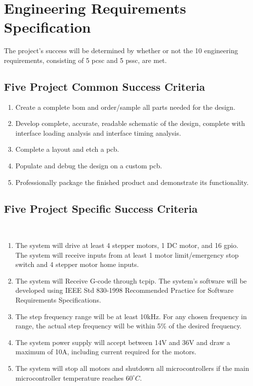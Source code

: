 \chapter{Engineering Requirements Specification}
The project's success will be determined by whether or not the 10 engineering requirements, consisting of 5 \gls{pcsc} and 5 \gls{pssc}, are met. 

\section{Five Project Common Success Criteria}
\begin{enumerate}
	\item Create a complete \gls{bom} and order/sample all parts needed for the design.
	\item Develop complete, accurate, readable schematic of the design, complete with interface loading analysis and interface timing analysis. 
	\item Complete a layout and etch a \gls{pcb}.
	\item Populate and debug the design on a custom \gls{pcb}.
	\item Professionally package the finished product and demonstrate its functionality.
\end{enumerate}

\section{Five Project Specific Success Criteria}\
\begin{enumerate}
	\item The system will drive at least 4 stepper motors, 1 DC motor, and 16 \gls{gpio}.
The system will receive inputs from at least 1 motor limit/emergency stop switch and 4 stepper motor home inputs.
	\item The system will Receive G-code through \gls{tcpip}.
The system’s software will be developed using IEEE Std 830-1998 Recommended Practice for Software Requirements Specifications.
	\item The step frequency range will be at least 10kHz.
For any chosen frequency in range, the actual step frequency will be within 5\% of the desired frequency.
	\item The system power supply will accept between 14V and 36V and draw a maximum of 10A, including current required for the motors. 
	\item The system will stop all motors and shutdown all microcontrollers if the main microcontroller temperature reaches $60^{\circ}C$.
\end{enumerate}

